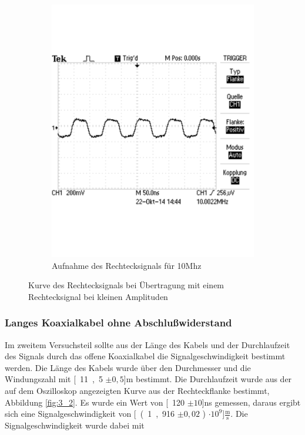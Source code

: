 \documentclass[12pt,a4paper]{article}
\begin{document}
\begin{figure}[H]
\begin{subfigure}[tb]{0.48\textwidth}
                \includegraphics[width=\textwidth , scale = 0.4]{3_1_10mhz.pdf}
                \caption[Aufnahme des Rechtecksignals für 10Mhz]{Aufnahme des Rechtecksignals für 10Mhz}
  				\label{fig:3_1_mhz}
        \end{subfigure}
        \caption{Kurve des Rechtecksignals bei Übertragung mit einem Rechtecksignal bei kleinen Amplituden}
        \label{fig:3_1_vergleich}
\end{figure}



\subsubsection{Langes Koaxialkabel ohne Abschlußwiderstand}

Im zweitem Versuchsteil sollte aus der Länge des Kabels und der Durchlaufzeit des Signals durch das offene Koaxialkabel die Signalgeschwindigkeit bestimmt werden. Die Länge des Kabels wurde über den Durchmesser und die Windungszahl mit \unit[11,5 $\pm 0,5$]{m} bestimmt. Die Durchlaufzeit wurde aus der auf dem Oszilloskop angezeigten Kurve aus der Rechteckflanke bestimmt, Abbildung \ref{fig:3_2}. Es wurde ein Wert von \unit[120 $\pm10$]{ns} gemessen, daraus ergibt sich eine Signalgeschwindigkeit von \unit[(1,916 $\pm 0,02$ ) $\cdot 10^9$]{$\frac{\text{m}}{\text{s}}$}. Die Signalgeschwindigkeit wurde dabei mit 
\end{document}
